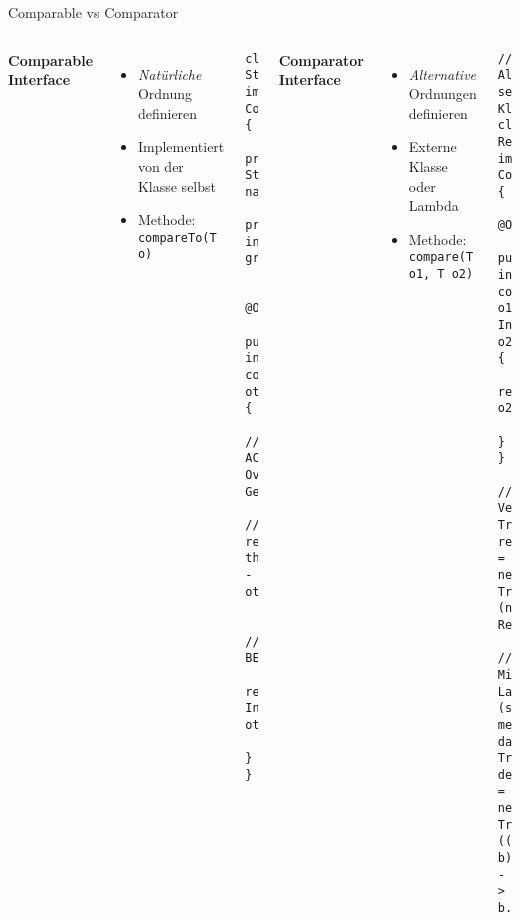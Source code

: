 \begin{frame}[fragile]{Comparable vs Comparator}
  \begin{columns}[T]
    \textbf{Comparable Interface}
    \begin{itemize}
      \item \textit{Natürliche} Ordnung definieren
      \item Implementiert von der Klasse selbst
      \item Methode: \texttt{compareTo(T o)}
    \end{itemize}

    \begin{lstlisting}[style=java, basicstyle=\tiny\ttfamily]
class Student implements Comparable<Student> {
    private String name;
    private int grade;

    @Override
    public int compareTo(Student other) {
        // ACHTUNG: Overflow-Gefahr!
        // return this.grade - other.grade;

        // BESSER:
        return Integer.compare(this.grade, other.grade);
    }
}
    \end{lstlisting}

    \textbf{Comparator Interface}
    \begin{itemize}
      \item \textit{Alternative} Ordnungen definieren
      \item Externe Klasse oder Lambda
      \item Methode: \texttt{compare(T o1, T o2)}
    \end{itemize}

    \begin{lstlisting}[style=java, basicstyle=\tiny\ttfamily]
// Als separate Klasse
class ReverseOrder implements Comparator<Integer> {
    @Override
    public int compare(Integer o1, Integer o2) {
        return o2.compareTo(o1);
    }
}

// Verwendung
TreeSet<Integer> reversed = new TreeSet<>(new ReverseOrder());

// Mit Lambda (später mehr dazu)
TreeSet<Integer> desc = new TreeSet<>((a, b) -> b.compareTo(a));
    \end{lstlisting}
  \end{columns}
\end{frame}

